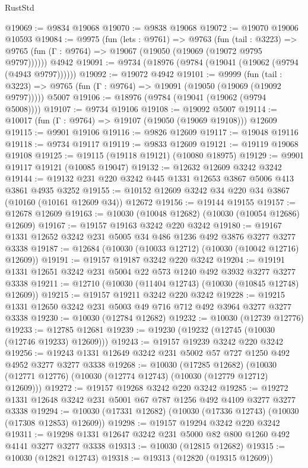 \begin{lexlean}{RustStd}
\begin{coremodule}
@19069 := @9834 @19068
@19070 := @9838 @19068
@19072 := @19070 @19006 @10593
@19084 := @9975
    (fun (lets : @9761) =>
    @9763
      (fun (tail : @3223) =>
      @9765 (fun (Γ : @9764) => @19067 (@19050 (@19069 (@19072 @9795 @9797))))))
    @4942
@19091 := @9734 (@18976 (@9784 (@19041 (@19062 (@9794 (@4943 @9797))))))
@19092 := @19072 @4942
@19101 := @9999
    (fun (tail : @3223) => @9765 (fun (Γ : @9764) => @19091 (@19050 (@19069 (@19092 @9797)))))
    @5007
@19106 := @18976 (@9784 (@19041 (@19062 (@9794 @5008))))
@19107 := @9734 @19106
@19108 := @19092 @5007
@19114 := @10017 (fun (Γ : @9764) => @19107 (@19050 (@19069 @19108))) @12609
@19115 := @9901 @19106
@19116 := @9826 @12609
@19117 := @19048 @19116
@19118 := @9734 @19117
@19119 := @9833 @12609
@19121 := @19119 @19068 @19108
@19125 := @19115 (@19118 @19121) (@10080 @18975)
@19129 := @9901 @19117 @19121 (@10085 @19047)
@19132 := @12632 @12609 @3242 @3242
@19144 := @19132 @231 @220 @3242 @445 @1331 @12653 @3867 @5006 @413 @3861 @4935 @3252
@19155 := @10152 @12609 @3242 @34 @220 @34 @3867 (@10160 (@10161 @12609 @34)) @12672
@19156 := @19144 @19155
@19157 := @12678 @12609
@19163 := @10030 (@10048 @12682) (@10030 (@10054 @12686) @12609)
@19167 := @19157 @19163 @3242 @220 @3242
@19180 := @19167 @1331 @12652 @3242 @231 @5005 @34 @486 @1236 @492 @3876 @3277 @3277 @3338
@19187 := @12684 (@10030 (@10033 @12712) (@10030 (@10042 @12716) @12609))
@19191 := @19157 @19187 @3242 @220 @3242
@19204 := @19191 @1331 @12651 @3242 @231 @5004 @22 @573 @1240 @492 @3932 @3277 @3277 @3338
@19211 := @12710 (@10030 (@11404 @12743) (@10030 (@10845 @12748) @12609))
@19215 := @19157 @19211 @3242 @220 @3242
@19228 := @19215 @1331 @12650 @3242 @231 @5003 @49 @716 @712 @492 @3964 @3277 @3277 @3338
@19230 := @10030 (@12784 @12682)
@19232 := @10030 (@12739 @12776)
@19233 := @12785 @12681
@19239 := @19230 (@19232 (@12745 (@10030 (@12746 @19233) @12609)))
@19243 := @19157 @19239 @3242 @220 @3242
@19256 := @19243 @1331 @12649 @3242 @231 @5002 @57 @727 @1250 @492 @4952 @3277 @3277 @3338
@19268 := @10030
    (@17285 @12682)
    (@10030 (@12771 @12776) (@10030 (@12774 @12743) (@10030 (@12779 @12712) @12609)))
@19272 := @19157 @19268 @3242 @220 @3242
@19285 := @19272 @1331 @12648 @3242 @231 @5001 @67 @787 @1256 @492 @4109 @3277 @3277 @3338
@19294 := @10030 (@17331 @12682) (@10030 (@17336 @12743) (@10030 (@17308 @12853) @12609))
@19298 := @19157 @19294 @3242 @220 @3242
@19311 := @19298 @1331 @12647 @3242 @231 @5000 @82 @800 @1260 @492 @4141 @3277 @3277 @3338
@19313 := @10030 (@12815 @12682)
@19315 := @10030 (@12821 @12743)
@19318 := @19313 (@12820 (@19315 @12609))

\end{coremodule}
\end{lexlean}
